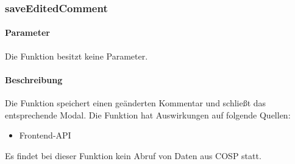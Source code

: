 \subsubsection{saveEditedComment}
\paragraph{Parameter} Die Funktion besitzt keine Parameter.
\paragraph{Beschreibung} Die Funktion speichert einen geänderten Kommentar und schließt das entsprechende Modal. Die Funktion hat Auswirkungen auf folgende Quellen:
\begin{itemize}
	\item Frontend-API
\end{itemize}
Es findet bei dieser Funktion kein Abruf von Daten aus {\glqq COSP\grqq} statt.